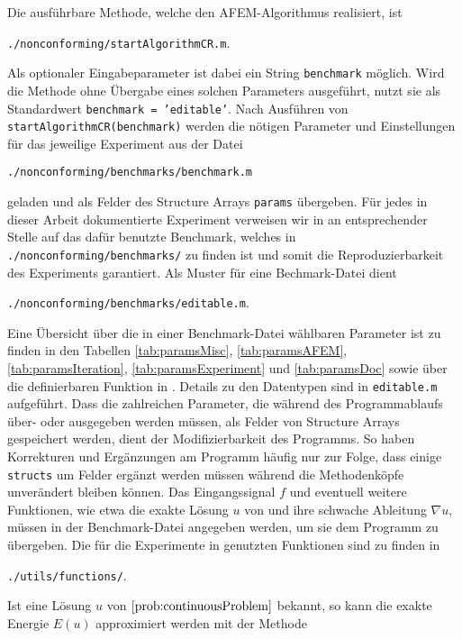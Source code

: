 Die ausführbare Methode, welche den AFEM-Algorithmus realisiert, ist
\begin{center}
  \texttt{./nonconforming/startAlgorithmCR.m}.
\end{center}
Als optionaler Eingabeparameter ist dabei ein String \texttt{benchmark}
möglich. 
Wird die Methode ohne Übergabe eines solchen Parameters ausgeführt, nutzt
sie als Standardwert \texttt{benchmark = 'editable'}.
Nach Ausführen von \texttt{startAlgorithmCR(benchmark)} werden die nötigen
Parameter und Einstellungen für das jeweilige Experiment aus der Datei
\begin{center}
  \texttt{./nonconforming/benchmarks/benchmark.m}
\end{center}
geladen und als Felder des Structure Arrays \texttt{params} übergeben. Für
jedes in dieser Arbeit dokumentierte Experiment verweisen wir in
 an entsprechender Stelle auf das dafür benutzte 
Benchmark, welches in \texttt{./nonconforming/benchmarks/} zu finden ist und
somit die Reproduzierbarkeit des Experiments garantiert. 
Als Muster für eine Bechmark-Datei dient
\begin{center}
  \texttt{./nonconforming/benchmarks/editable.m}.
\end{center}
Eine Übersicht über die in einer Benchmark-Datei wählbaren Parameter ist
zu finden in den Tabellen \ref{tab:paramsMisc}, \ref{tab:paramsAFEM}, 
\ref{tab:paramsIteration}, \ref{tab:paramsExperiment} und \ref{tab:paramsDoc}
sowie über die definierbaren Funktion in .
Details zu den Datentypen sind in \texttt{editable.m} aufgeführt.
Dass die zahlreichen Parameter, die während des Pro\-gramm\-ab\-laufs
über- oder ausgegeben werden müssen, als Felder von
Struc\-ture Ar\-rays gespeichert werden, dient der Modifizierbarkeit des
Programms. 
So haben Korrekturen und Ergänzungen am Programm häufig nur zur Folge, dass
einige \texttt{structs} um Felder ergänzt werden müssen während die 
Methodenköpfe unverändert bleiben können.
Das Eingangssignal $f$ und eventuell weitere Funktionen, wie etwa die exakte
Lösung $u$ von  und ihre schwache Ableitung
$\nabla u$, müssen in der Benchmark-Datei angegeben werden, um sie dem
Programm zu übergeben. 
Die für die Experimente in  genutzten Funktionen sind zu
finden in 
\begin{center}
  \texttt{./utils/functions/}.
\end{center}
Ist eine Lösung $u$ von $\Cref{prob:continuousProblem}$ bekannt, so kann die
exakte Energie $E(u)$ approximiert werden mit der Methode
